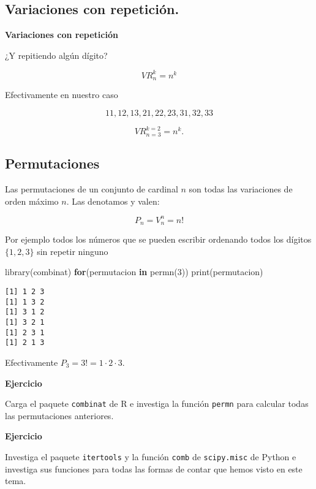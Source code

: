 \documentclass[
  letterpaper,
  DIV=11,
  numbers=noendperiod]{scrreprt}
\newenvironment{Shaded}{\begin{snugshade}}{\end{snugshade}}
\newcommand{\ControlFlowTok}[1]{\textcolor[rgb]{0.00,0.23,0.31}{\textbf{#1}}}
\newcommand{\DecValTok}[1]{\textcolor[rgb]{0.68,0.00,0.00}{#1}}
\newcommand{\FunctionTok}[1]{\textcolor[rgb]{0.28,0.35,0.67}{#1}}
\newcommand{\NormalTok}[1]{\textcolor[rgb]{0.00,0.23,0.31}{#1}}
\begin{document}
\subsection{Variaciones con
repetición.}\label{variaciones-con-repeticiuxf3n.}

\textbf{Variaciones con repetición}

¿Y repitiendo algún dígito?

\[VR_n^k=n^k\]

Efectivamente en nuestro caso

\[11,12,13,21,22,23,31,32,33\]

\[
VR^{k=2}_{n=3}=n^k.
\]

\subsection{Permutaciones}\label{permutaciones}

Las permutaciones de un conjunto de cardinal \(n\) son todas las
variaciones de orden máximo \(n\). Las denotamos y valen:

\[
P_n=V_n^n=n!
\]

Por ejemplo todos los números que se pueden escribir ordenando todos los
dígitos \(\{1,2,3\}\) sin repetir ninguno

\begin{Shaded}
\begin{Highlighting}[]
\FunctionTok{library}\NormalTok{(combinat)}
\ControlFlowTok{for}\NormalTok{(permutacion }\ControlFlowTok{in} \FunctionTok{permn}\NormalTok{(}\DecValTok{3}\NormalTok{)) }\FunctionTok{print}\NormalTok{(permutacion)}
\end{Highlighting}
\end{Shaded}

\begin{verbatim}
[1] 1 2 3
[1] 1 3 2
[1] 3 1 2
[1] 3 2 1
[1] 2 3 1
[1] 2 1 3
\end{verbatim}

Efectivamente \(P_3=3!=1\cdot  2\cdot 3.\)

\textbf{Ejercicio}

Carga el paquete \texttt{combinat} de R e investiga la función
\texttt{permn} para calcular todas las permutaciones anteriores.

\textbf{Ejercicio}

Investiga el paquete \texttt{itertools} y la función \texttt{comb} de
\texttt{scipy.misc} de Python e investiga sus funciones para todas las
formas de contar que hemos visto en este tema.
\end{document}
